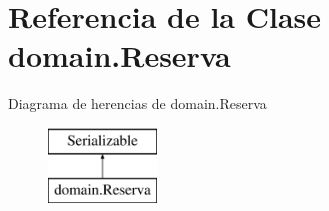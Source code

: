 \hypertarget{classdomain_1_1_reserva}{}\section{Referencia de la Clase domain.\+Reserva}
\label{classdomain_1_1_reserva}
Diagrama de herencias de domain.\+Reserva\begin{figure}[H]
\begin{center}
\leavevmode
\includegraphics[height=2.000000cm]{classdomain_1_1_reserva}
\end{center}
\end{figure}
